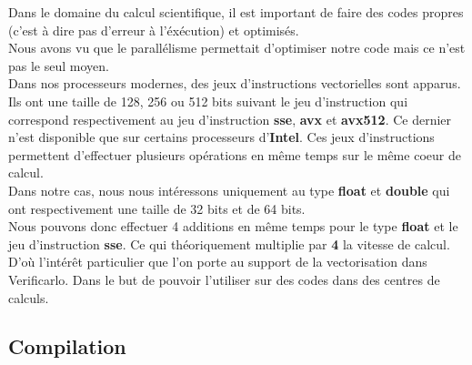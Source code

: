 \documentclass[11pt]{article}
\begin{document}
Dans le domaine du calcul scientifique, il est important de faire
des codes propres (c'est à dire pas d'erreur à l'éxécution) et
optimisés.\\
\vspace{5mm}
Nous avons vu que le parallélisme permettait d'optimiser notre code
mais ce n'est pas le seul moyen.\\
\vspace{5mm}
Dans nos processeurs modernes, des jeux d'instructions vectorielles
sont apparus. Ils ont une taille de 128, 256 ou 512 bits suivant le
jeu d'instruction qui correspond respectivement au jeu
d'instruction \textbf{sse}, \textbf{avx} et \textbf{avx512}. Ce dernier n'est disponible
que sur certains processeurs d'\textbf{Intel}. Ces jeux d'instructions
permettent d'effectuer plusieurs opérations en même temps sur le
même coeur de calcul.
\\ \vspace{5mm}
Dans notre cas, nous nous intéressons uniquement au type \textbf{float} et
\textbf{double} qui ont respectivement une taille de 32 bits et de 64
bits.
\\ \vspace{5mm}
Nous pouvons donc effectuer 4 additions en même temps pour le type
\textbf{float} et le jeu d'instruction \textbf{sse}. Ce qui théoriquement
multiplie par \textbf{4} la vitesse de calcul. D'où l'intérêt particulier
que l'on porte au support de la vectorisation dans
Verificarlo. Dans le but de pouvoir l'utiliser sur des codes dans
des centres de calculs.

\subsection{Compilation}
\label{sec:org6f5bd66}
\end{document}
